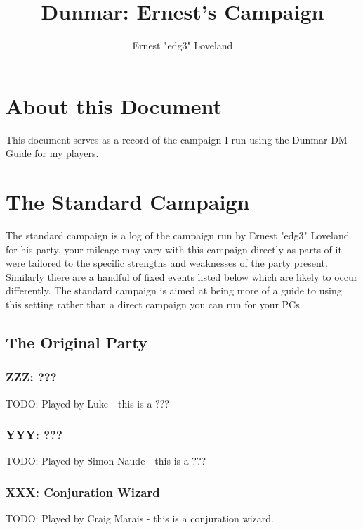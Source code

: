 \documentclass[10pt,twoside,twocolumn]{article}
\title{Dunmar: Ernest's Campaign}
\author{Ernest "edg3" Loveland}
\begin{document}
\selectfont %

\maketitle
\tableofcontents

\section{About this Document}
This document serves as a record of the campaign I run using the Dunmar DM Guide for my players.

\section{The Standard Campaign}
The standard campaign is a log of the campaign run by Ernest "edg3" Loveland for his party, your mileage may vary with this campaign directly as parts of it were tailored to the specific strengths and weaknesses of the party present. Similarly there are a handful of fixed events listed below which are likely to occur differently. The standard campaign is aimed at being more of a guide to using this setting rather than a direct campaign you can run for your PCs.

\subsection{The Original Party}
\subsubsection{ZZZ: ???}
TODO: Played by Luke - this is a ???
\subsubsection{YYY: ???}
TODO: Played by Simon Naude - this is a  ???
\subsubsection{XXX: Conjuration Wizard}
TODO: Played by Craig Marais - this is a conjuration wizard.
\end{document}
